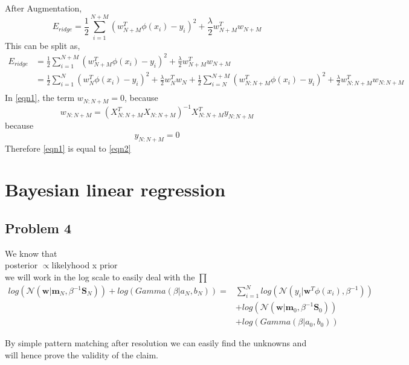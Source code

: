 \documentclass[5pt,a4paper]{article}
\begin{document}
	After Augmentation,
	\begin{equation*}
	E_{ridge}=\frac{1}{2}\sum_{i=1}^{N+M}(w^T_{N+M} \phi(x_i)-y_i)^2+\frac{\lambda}{2} w_{N+M}^Tw_{N+M}
	\end{equation*}
	This can be split as,
	\begin{eqnarray}
		E_{ridge}&=\frac{1}{2}\sum_{i=1}^{N+M}(w^T_{N+M} \phi(x_i)-y_i)^2+\frac{\lambda}{2} w_{N+M}^Tw_{N+M}\\
		&=\frac{1}{2}\sum_{i=1}^{N}(w^T_N \phi(x_i)-y_i)^2+\frac{\lambda}{2} w_N^Tw_N+\frac{1}{2}\sum_{i=N}^{N+M}(w^T_{N:N+M} \phi(x_i)-y_i)^2+\frac{\lambda}{2} w_{N:N+M}^Tw_{N:N+M} \\\label{eqn1}
	\end{eqnarray}
	In \ref{eqn1}, the term $w_{N:N+M}=0$, because
	\begin{equation*}
	w_{N:N+M}=(X_{N:N+M}^TX_{N:N+M})^{-1}X_{N:N+M}^Ty_{N:N+M}
	\end{equation*}
	because
	\begin{equation*}
	y_{N:N+M}=0
	\end{equation*}
    Therefore \ref{eqn1} is equal to  \ref{eqn2}
    \section{Bayesian linear regression}
    \subsection*{Problem 4}
    We know that\\
    posterior $\propto$likelyhood x prior\\
    we will work in the log scale to easily deal with the $\prod$
    \begin{eqnarray*}
    log(\mathcal{N}(\textbf{w}|\textbf{m}_N,\beta^{-1}\textbf{S}_N))+log(Gamma(\beta|a_N,b_N))=& \sum_{i=1}^{N}log(\mathcal{N}(y_i|\textbf{w}^T\phi(x_i),\beta^{-1}))\\&+ log(\mathcal{N}(\textbf{w}|\textbf{m}_0,\beta^{-1}\textbf{S}_0))\\&+log(Gamma(\beta|a_0,b_0))
    \end{eqnarray*}
	
	By simple pattern matching after resolution we can easily find the unknowns and will hence prove the validity of the claim. 


	
	
	
	
\end{document}
